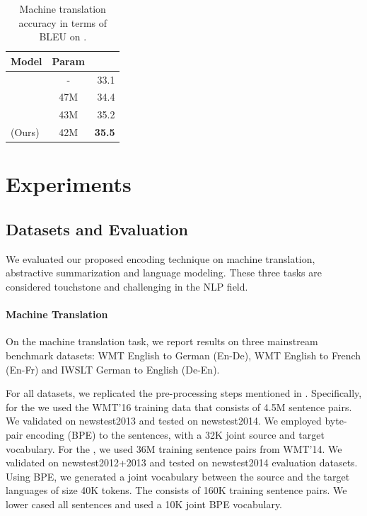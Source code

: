 \documentclass{article}
\begin{document}
\begin{table}[t]
\centering
\caption{Machine translation accuracy in terms of BLEU on \iwslt{}.}
\vskip 0.15in
\begin{tabular}{lcr}
\toprule
Model & Param & \iwslt{} \\
\midrule
\citet{deng2018latent} & - & 33.1 \\
\citet{vaswani2017attention} & 47M & 34.4 \\
\citet{wu2019pay} & 43M & 35.2 \\
\midrule
\talkconvfull{} (Ours) & 42M & \textbf{35.5} \\
\bottomrule
\end{tabular}
\label{tab:mt2}
\end{table}


\section{Experiments}
\subsection{Datasets and Evaluation}
\label{sec:datasets}
We evaluated our proposed encoding technique on machine translation, abstractive summarization and language modeling. These three tasks are considered touchstone and challenging in the NLP field.

\paragraph{Machine Translation} On the machine translation task, we report results on three mainstream benchmark datasets: WMT English to German (En-De), WMT English to French (En-Fr) and IWSLT German to English (De-En). 

For all datasets, we replicated the pre-processing steps mentioned in \citet{wu2019pay}. Specifically, for the \ende{} we used the WMT'16 training data that consists of 4.5M sentence pairs. We validated on newstest2013 and tested on newstest2014. We employed byte-pair encoding (BPE) \cite{DBLP:journals/corr/SennrichHB15} to the sentences, with a 32K joint source and target vocabulary. For the \enfr{}, we used 36M training sentence pairs from WMT'14. We validated on newstest2012+2013 and tested on newstest2014 evaluation datasets. Using BPE, we generated a joint vocabulary between the source and the target languages of size 40K tokens. The \iwslt{} consists of 160K training sentence pairs. We lower cased all sentences and used a 10K joint BPE vocabulary.
\end{document}
